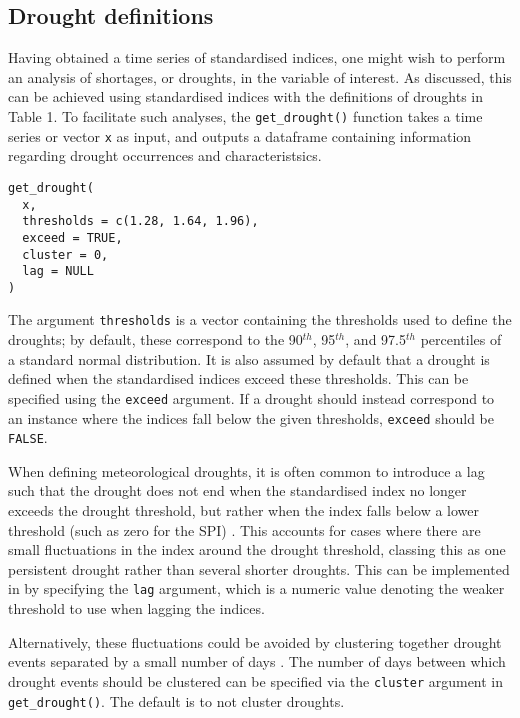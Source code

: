 \hypertarget{drought-definitions}{%
\subsection{Drought definitions}\label{drought-definitions}}

Having obtained a time series of standardised indices, one might wish to perform an analysis of shortages, or droughts, in the variable of interest. As discussed, this can be achieved using standardised indices with the definitions of droughts in Table 1. To facilitate such analyses, the \texttt{get\_drought()} function takes a time series or vector \texttt{x} as input, and outputs a dataframe containing information regarding drought occurrences and characteristsics.

\begin{verbatim}
get_drought(
  x,
  thresholds = c(1.28, 1.64, 1.96),
  exceed = TRUE,
  cluster = 0,
  lag = NULL
)
\end{verbatim}

The argument \texttt{thresholds} is a vector containing the thresholds used to define the droughts; by default, these correspond to the 90\(^{th}\), 95\(^{th}\), and 97.5\(^{th}\) percentiles of a standard normal distribution. It is also assumed by default that a drought is defined when the standardised indices exceed these thresholds. This can be specified using the \texttt{exceed} argument. If a drought should instead correspond to an instance where the indices fall below the given thresholds, \texttt{exceed} should be \texttt{FALSE}.

When defining meteorological droughts, it is often common to introduce a lag such that the drought does not end when the standardised index no longer exceeds the drought threshold, but rather when the index falls below a lower threshold (such as zero for the SPI) \citep[e.g.][]{MckeeEtAl1993}. This accounts for cases where there are small fluctuations in the index around the drought threshold, classing this as one persistent drought rather than several shorter droughts. This can be implemented in  by specifying the \texttt{lag} argument, which is a numeric value denoting the weaker threshold to use when lagging the indices.

Alternatively, these fluctuations could be avoided by clustering together drought events separated by a small number of days \citep[e.g.][]{OteroEtAl2022}. The number of days between which drought events should be clustered can be specified via the \texttt{cluster} argument in \texttt{get\_drought()}. The default is to not cluster droughts.


